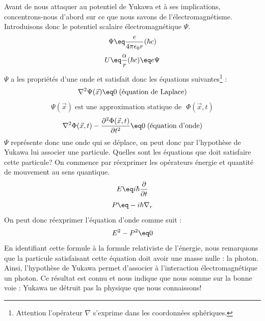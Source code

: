 Avant de nous attaquer au potentiel de Yukawa et à ses implications, concentrons-nous d'abord sur ce que nous savons de l'électromagnétisme. Introduisons donc le potentiel scalaire électromagnétique $\Psi$.
\begin{equation*}
    \Psi \eq \frac{e}{4\pi \epsilon_0 r}(\hbar c)
\end{equation*}
\begin{equation*}
    U \eq  \frac{\alpha}{r}(\hbar c)\eq e\Psi 
\end{equation*}
$\Psi$ a les propriétés d'une onde et satisfait donc les équations suivantes\footnote{Attention l'opérateur $\nabla$ s'exprime dans les coordonnées sphériques.} :
\begin{equation*}
    \nabla^2 \Psi(\Vec{x}) \eq 0 \; \text{(équation de Laplace)}
\end{equation*}
\begin{equation*}
    \Psi(\Vec{x}) \; \text{est une approximation statique de }\; \Phi(\Vec{x},t)
\end{equation*}
\begin{equation*}
    \nabla^2 \Phi(\Vec{x},t) - \dfrac{\partial^2\Phi(\Vec{x},t)}{ \partial t^2} \eq 0 \; \text{(équation d'onde)}
\end{equation*}
$\Psi$ représente donc une onde qui se déplace, on peut donc par l'hypothèse de Yukawa lui associer une particule. Quelles sont les équations que doit satisfaire cette particule? On commence par réexprimer les opérateurs énergie et quantité de mouvement au sens quantique.
\begin{equation*}
    E \eq i\hbar \dfrac{\partial}{\partial t}
\end{equation*}
\begin{equation*}
    P\eq -i\hbar \nabla_r
\end{equation*}
On peut donc réexprimer l'équation d'onde comme suit :
\begin{equation*}
    E^2 - P^2 \eq 0
\end{equation*}
En identifiant cette formule à la formule relativiste de l'énergie, nous remarquons que la particule satisfaisant cette équation doit avoir une masse nulle : la photon. Ainsi, l'hypothèse de Yukawa permet d'associer à l'interaction électromagnétique un photon. Ce résultat est connu et nous indique que nous somme sur la bonne voie : Yukawa ne détruit pas la physique que nous connaissons!\\

